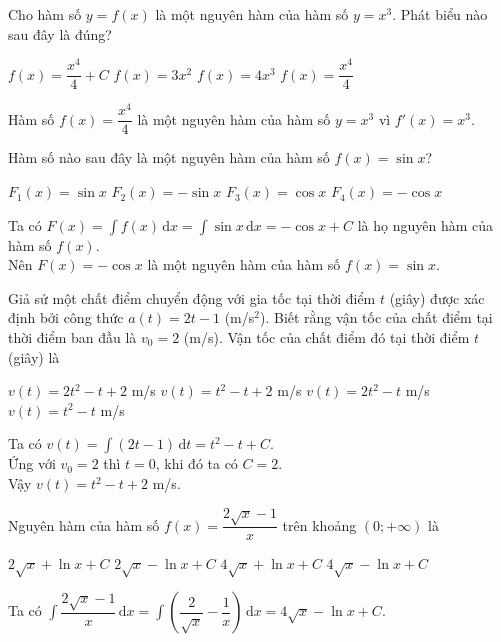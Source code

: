 \documentclass[12pt,aspectratio=169]{beamer}
\begin{document}
\begin{tracnghiem}%
	Cho hàm số $y = f(x)$ là một nguyên hàm của hàm số $y = x^3$. Phát biểu nào sau đây là đúng?

	\choice
		{$f(x) = \dfrac{x^4}
		{4} + C$}
		{$f(x) = 3x^2$}
		{$f(x) = 4x^3$}
		{\True $f(x) = \dfrac{x^4}{4}$}

	\begin{loigiai}
			Hàm số $f(x) = \dfrac{x^4}{4}$ là một nguyên hàm của hàm số $y = x^3$ vì $f'(x) = x^3$.
	\end{loigiai}
\end{tracnghiem}

\begin{tracnghiem}%
	Hàm số nào sau đây là một nguyên hàm của hàm số $f(x)=\sin x$?

	\choice
		{$F_1(x)=\sin x$}
		{$F_2(x)=-\sin x$}
		{$F_3(x)=\cos x$}
		{\True $F_4(x)=-\cos x$}

	\begin{loigiai}
			Ta có $F(x)=\displaystyle\int f(x)\mathrm{\,d}x = \displaystyle\int \sin x\mathrm{\,d}x =-\cos x+C$ là họ nguyên hàm của hàm số $f(x)$.\\
			Nên $F(x)=-\cos x$ là một nguyên hàm của hàm số $f(x)=\sin x$.
	\end{loigiai}
\end{tracnghiem}

\begin{tracnghiem}%
	Giả sử một chất điểm chuyển động với gia tốc tại thời điểm $t$ (giây) được xác định bởi công thức $a(t)=2t-1$ (m/s$^2$). Biết rằng vận tốc của chất điểm tại thời điểm ban đầu là $v_0=2$ (m/s). Vận tốc của chất điểm đó tại thời điểm $t$ (giây) là

	\choice
		{$v(t)=2t^2-t+2$ m/s}
		{\True $v(t)=t^2-t+2$ m/s}
		{$v(t)=2t^2-t$ m/s}
		{$v(t)=t^2-t$ m/s}

	\begin{loigiai}
			Ta có $v(t)=\displaystyle\int (2t-1) \mathrm{\,d}t=t^2-t+C$.\\
			Ứng với $v_0=2$ thì $t=0$, khi đó ta có $C=2$.\\
			Vậy $v(t)=t^2-t+2$ m/s.
	\end{loigiai}
\end{tracnghiem}

\begin{tracnghiem}%
	Nguyên hàm của hàm số $f(x)=\dfrac{2\sqrt{x}-1}{x}$ trên khoảng $(0;+\infty)$ là

	\choice
		{$2\sqrt{x}+\ln x+C$}
		{$2\sqrt{x}-\ln x+C$}
		{$4\sqrt{x}+\ln x+C$}
		{\True $4\sqrt{x}-\ln x+C$}

	\begin{loigiai}
			Ta có $\displaystyle\int \dfrac{2\sqrt{x}-1}{x} \mathrm{\,d}x=\displaystyle\int \left(\dfrac{2}{\sqrt{x}}-\dfrac{1}{x}\right) \mathrm{\,d}x=4\sqrt{x}-\ln x+C$.
	\end{loigiai}
\end{tracnghiem}
\end{document}
